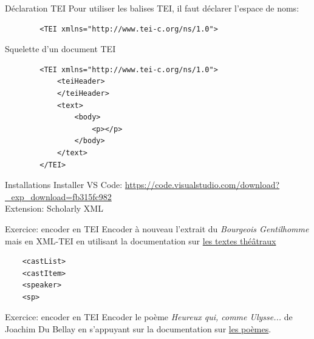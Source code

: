 \begin{frame}[fragile]{Déclaration TEI}
    Pour utiliser les balises TEI, il faut déclarer l'espace de noms:\\
    \begin{lstlisting}
        <TEI xmlns="http://www.tei-c.org/ns/1.0">
    \end{lstlisting}
\end{frame}

\begin{frame}[fragile]{Squelette d'un document TEI}
    \begin{lstlisting}
        <TEI xmlns="http://www.tei-c.org/ns/1.0">
            <teiHeader>
            </teiHeader>
            <text>
                <body>
                    <p></p>
                </body>
            </text>
        </TEI>
    \end{lstlisting}
\end{frame}

\begin{frame}{Installations}
    Installer VS Code: \url{https://code.visualstudio.com/download?_exp_download=fb315fc982}\\
    Extension: Scholarly XML
\end{frame}

\begin{frame}[fragile]{Exercice: encoder en TEI}
Encoder à nouveau l'extrait du \textit{Bourgeois Gentilhomme} mais en XML-TEI en utilisant la documentation sur \href{https://www.tei-c.org/release/doc/tei-p5-doc/en/html/DR.html}{les textes théâtraux}\\
\begin{lstlisting}
    <castList> 
    <castItem> 
    <speaker> 
    <sp>
\end{lstlisting}    
\end{frame}


\begin{frame}{Exercice: encoder en TEI}
    Encoder le poème \textit{Heureux qui, comme Ulysse...} de Joachim Du Bellay en s'appuyant sur la documentation sur \href{https://www.tei-c.org/release/doc/tei-p5-doc/en/html/VE.html}{les poèmes}.
\end{frame}